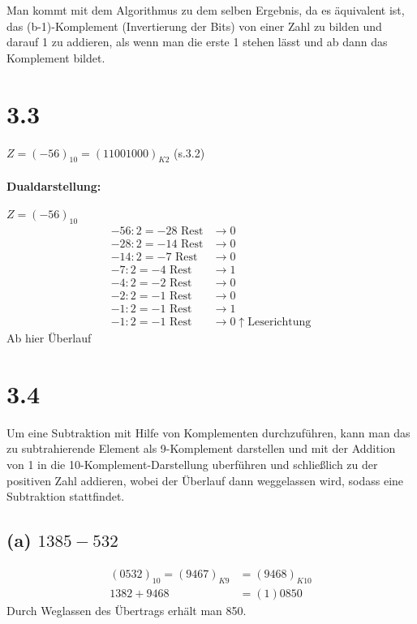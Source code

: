 \documentclass[11pt,a4paper]{article}
\begin{document}
Man kommt mit dem Algorithmus zu dem selben Ergebnis, da es äquivalent ist, das (b-1)-Komplement (Invertierung der Bits) von einer Zahl zu bilden und darauf 1 zu addieren, als wenn man die erste 1 stehen lässt und ab dann das Komplement bildet.

\newpage
\section*{3.3}
\label {sec:3.3}


$Z = (-56)_{10} = (11001000)_{K2}$ (s.3.2)

\paragraph{Dualdarstellung:}
$Z = (-56)_{10}$
\begin{align*}
-56: 2 = -28 \mbox{ Rest} &\rightarrow 0\\
-28: 2 = -14 \mbox{ Rest} &\rightarrow 0\\
-14 :2 = -7 \mbox{ Rest} &\rightarrow 0\\
-7 : 2 = -4 \mbox{ Rest} &\rightarrow 1\\
-4 : 2 = -2 \mbox{ Rest} &\rightarrow 0\\
-2 : 2 = -1 \mbox{ Rest} &\rightarrow 0\\
-1 : 2 = -1 \mbox{ Rest} &\rightarrow 1\\
-1 : 2 = -1 \mbox{ Rest} &\rightarrow 0 \uparrow \mbox{Leserichtung}
\end{align*}
Ab hier Überlauf

\section*{3.4}
\label {sec:3.4}

Um eine Subtraktion mit Hilfe von Komplementen durchzuführen, kann man das zu subtrahierende Element als 9-Komplement darstellen und mit der Addition von 1 in die 10-Komplement-Darstellung uberführen und schließlich zu der positiven Zahl addieren, wobei der Überlauf dann weggelassen wird, sodass eine Subtraktion stattfindet.

\subsection*{(a) $1385-532$}

\begin{align*}
(0532)_{10} = (9467)_{K9} &= (9468)_{K10}\\
1382 + 9468 &= (1)0850
\end{align*}
Durch Weglassen des Übertrags erhält man 850.
\end{document}
